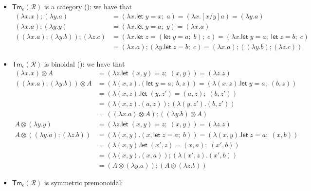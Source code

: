 \documentclass[acmsmall,screen,review]{acmart}
\newcommand{\mc}[1]{\ensuremath{\mathcal{#1}}}
\newcommand{\ms}[1]{\ensuremath{\mathsf{#1}}}
\newcommand{\letexpr}[3]{\ensuremath{\ms{let}\;#1 = #2;\;#3}}
\newcommand{\cmark}{\ding{51}}%
\begin{document}
\begin{itemize}
  \item $\ms{Tm}_\epsilon(\mc{R})$ is a category (\cmark): we have that
  \begin{align*}
    (\lambda x . x) ; (\lambda y . a) &= (\lambda x . \letexpr{y}{x}{a}) 
    = (\lambda x . [x/y]a) = (\lambda y . a) \\
    (\lambda x . a) ; (\lambda y . y) &= (\lambda x . \letexpr{y}{a}{y}) = (\lambda x . a) \\
    ((\lambda x . a) ; (\lambda y . b)) ; (\lambda z . c)
    &= (\lambda x . \letexpr{z}{(\letexpr{y}{a}{b})}{c})
    = (\lambda x . \letexpr{y}{a}{\letexpr{z}{b}{c}}) \\
    &= (\lambda x . a) ; (\lambda y . \letexpr{z}{b}{c})
    = (\lambda x . a) ; ((\lambda y . b) ; (\lambda z . c))
  \end{align*}
  \item $\ms{Tm}_\epsilon(\mc{R})$ is binoidal (\cmark): we have that
  \begin{align*}
    (\lambda x . x) \otimes A 
    &= (\lambda z . \letexpr{(x, y)}{z}{(x, y)}) = (\lambda z . z)\
    \\
    ((\lambda x . a) ; (\lambda y . b)) \otimes A
    &= (\lambda (x, z) . (\letexpr{y}{a}{b}, z))
    = (\lambda (x, z) . \letexpr{y}{a}{(b, z)}) \\
    &= (\lambda (x, z) . \letexpr{(y, z')}{(a, z)}{(b, z')}) \\
    &= (\lambda (x, z) . (a, z)) ; (\lambda (y, z') . (b, z')) \\
    &= ((\lambda x . a) \otimes A) ; ((\lambda y  . b) \otimes A) \\
    A \otimes (\lambda y . y)
    &= (\lambda z . \letexpr{(x, y)}{z}{(x, y)}) = (\lambda z . z) \\
    A \otimes ((\lambda y . a) ; (\lambda z . b))
    &= (\lambda (x, y) . (x, \letexpr{z}{a}{b}))
    = (\lambda (x, y) . \letexpr{z}{a}{(x, b)}) \\
    &= (\lambda (x, y) . \letexpr{(x', z)}{(x, a)}{(x', b)}) \\
    &= (\lambda (x, y) . (x, a)) ; (\lambda (x', z) . (x', b)) \\
    &= (A \otimes (\lambda y . a)) ; (A \otimes (\lambda z . b)) 
  \end{align*}
  \item $\ms{Tm}_\epsilon(\mc{R})$ is symmetric premonoidal: 

\end{itemize}
\end{document}
